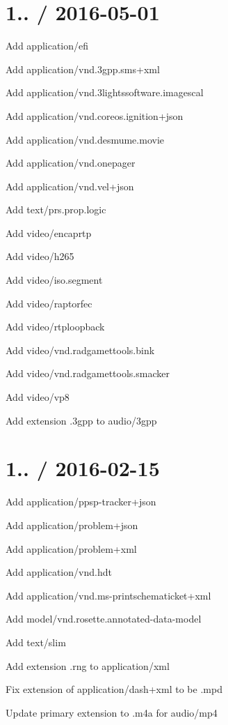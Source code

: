 \section*{1.. / 2016-\/05-\/01 }


\begin{DoxyItemize}
\item Add {\ttfamily application/efi}
\item Add {\ttfamily application/vnd.\+3gpp.\+sms+xml}
\item Add {\ttfamily application/vnd.\+3lightssoftware.\+imagescal}
\item Add {\ttfamily application/vnd.\+coreos.\+ignition+json}
\item Add {\ttfamily application/vnd.\+desmume.\+movie}
\item Add {\ttfamily application/vnd.\+onepager}
\item Add {\ttfamily application/vnd.\+vel+json}
\item Add {\ttfamily text/prs.\+prop.\+logic}
\item Add {\ttfamily video/encaprtp}
\item Add {\ttfamily video/h265}
\item Add {\ttfamily video/iso.\+segment}
\item Add {\ttfamily video/raptorfec}
\item Add {\ttfamily video/rtploopback}
\item Add {\ttfamily video/vnd.\+radgamettools.\+bink}
\item Add {\ttfamily video/vnd.\+radgamettools.\+smacker}
\item Add {\ttfamily video/vp8}
\item Add extension {\ttfamily .3gpp} to {\ttfamily audio/3gpp}
\end{DoxyItemize}

\section*{1.. / 2016-\/02-\/15 }


\begin{DoxyItemize}
\item Add {\ttfamily application/ppsp-\/tracker+json}
\item Add {\ttfamily application/problem+json}
\item Add {\ttfamily application/problem+xml}
\item Add {\ttfamily application/vnd.\+hdt}
\item Add {\ttfamily application/vnd.\+ms-\/printschematicket+xml}
\item Add {\ttfamily model/vnd.\+rosette.\+annotated-\/data-\/model}
\item Add {\ttfamily text/slim}
\item Add extension {\ttfamily .rng} to {\ttfamily application/xml}
\item Fix extension of {\ttfamily application/dash+xml} to be {\ttfamily .mpd}
\item Update primary extension to {\ttfamily .m4a} for {\ttfamily audio/mp4}
\end{DoxyItemize}

